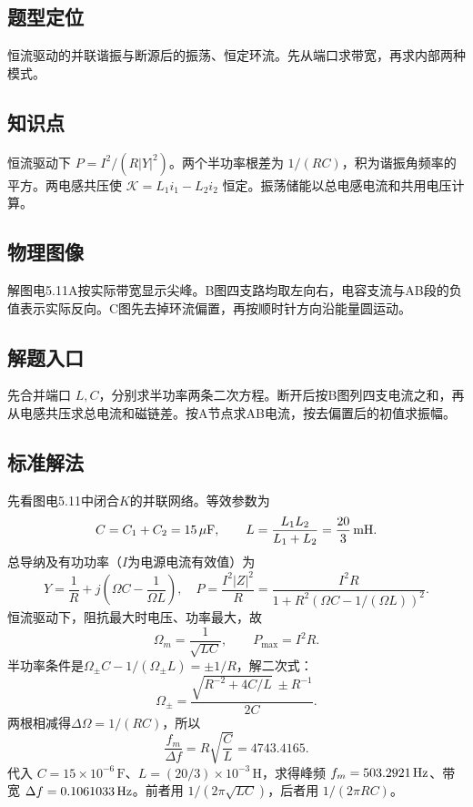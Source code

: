 \documentclass[UTF8,fontset=fandol,a4paper,11pt]{ctexart}
\begin{document}


\subsection*{题型定位}

恒流驱动的并联谐振与断源后的振荡、恒定环流。先从端口求带宽，再求内部两种模式。



\subsection*{知识点}

恒流驱动下 $P=I^2/(R|Y|^2)$。两个半功率根差为 $1/(RC)$，积为谐振角频率的平方。两电感共压使 $\mathcal K=L_1i_1-L_2i_2$ 恒定。振荡储能以总电感电流和共用电压计算。



\subsection*{物理图像}

解图电5.11A按实际带宽显示尖峰。B图四支路均取左向右，电容支流与AB段的负值表示实际反向。C图先去掉环流偏置，再按顺时针方向沿能量圆运动。



\subsection*{解题入口}

先合并端口 $L,C$，分别求半功率两条二次方程。断开后按B图列四支电流之和，再从电感共压求总电流和磁链差。按A节点求AB电流，按去偏置后的初值求振幅。


\subsection*{标准解法}


先看图电5.11中闭合$K$的并联网络。等效参数为
\[
 C=C_1+C_2=15\,\mu{\rm F},\qquad
 L=\frac{L_1L_2}{L_1+L_2}=\frac{20}{3}\,{\rm mH}.
\]
总导纳及有功功率（$I$为电源电流有效值）为
\[
 Y=\frac1R+j\left(\Omega C-\frac1{\Omega L}\right),\quad
 P=\frac{I^2|Z|^2}{R}
 =\frac{I^2R}{1+R^2(\Omega C-1/(\Omega L))^2}.
\]
恒流驱动下，阻抗最大时电压、功率最大，故
\[
 \Omega_m=\frac1{\sqrt{LC}},\qquad P_{\max}=I^2R.
\]
半功率条件是$\Omega_\pm C-1/(\Omega_\pm L)=\pm1/R$，解二次式：
\[
 \Omega_\pm=\frac{\sqrt{R^{-2}+4C/L}\ \pm R^{-1}}{2C}.
\]
两根相减得$\Delta\Omega=1/(RC)$，所以
\[
 \boxed{\frac{f_m}{\Delta f}=R\sqrt{\frac CL}
 =4743.4165.}
\]
代入 $C=15\times10^{-6}\,\mathrm F$、$L=(20/3)\times10^{-3}\,\mathrm H$，求得峰频 $f_m=503.2921\,{\rm Hz}$、带宽 $\Delta f=0.1061033\,{\rm Hz}$。前者用 $1/(2\pi\sqrt{LC})$，后者用 $1/(2\pi RC)$。
\end{document}

